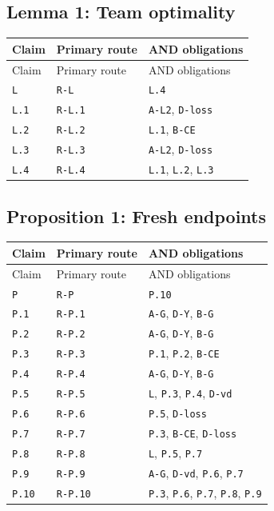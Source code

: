 \documentclass[11pt,letterpaper]{article}
\begin{document}
{\footnotesize \subsection{Lemma 1: Team optimality}
\begin{longtable}{>{\raggedright\arraybackslash}p{.14\linewidth}>{\raggedright\arraybackslash}p{.21\linewidth}>{\raggedright\arraybackslash}p{.54\linewidth}}
\toprule
Claim & Primary route & AND obligations \\
\midrule\endfirsthead
\toprule
Claim & Primary route & AND obligations \\
\midrule\endhead
\bottomrule\endfoot
\texttt{L} & \texttt{R-L} & \texttt{L.4} \\[3pt]
\texttt{L.1} & \texttt{R-L.1} & \texttt{A-L2}, \texttt{D-loss} \\[3pt]
\texttt{L.2} & \texttt{R-L.2} & \texttt{L.1}, \texttt{B-CE} \\[3pt]
\texttt{L.3} & \texttt{R-L.3} & \texttt{A-L2}, \texttt{D-loss} \\*[3pt]
\texttt{L.4} & \texttt{R-L.4} & \texttt{L.1}, \texttt{L.2}, \texttt{L.3} \\[3pt]
\end{longtable}
\subsection{Proposition 1: Fresh endpoints}
\begin{longtable}{>{\raggedright\arraybackslash}p{.14\linewidth}>{\raggedright\arraybackslash}p{.21\linewidth}>{\raggedright\arraybackslash}p{.54\linewidth}}
\toprule
Claim & Primary route & AND obligations \\
\midrule\endfirsthead
\toprule
Claim & Primary route & AND obligations \\
\midrule\endhead
\bottomrule\endfoot
\texttt{P} & \texttt{R-P} & \texttt{P.10} \\[3pt]
\texttt{P.1} & \texttt{R-P.1} & \texttt{A-G}, \texttt{D-Y}, \texttt{B-G} \\[3pt]
\texttt{P.2} & \texttt{R-P.2} & \texttt{A-G}, \texttt{D-Y}, \texttt{B-G} \\[3pt]
\texttt{P.3} & \texttt{R-P.3} & \texttt{P.1}, \texttt{P.2}, \texttt{B-CE} \\[3pt]
\texttt{P.4} & \texttt{R-P.4} & \texttt{A-G}, \texttt{D-Y}, \texttt{B-G} \\[3pt]
\texttt{P.5} & \texttt{R-P.5} & \texttt{L}, \texttt{P.3}, \texttt{P.4}, \texttt{D-vd} \\[3pt]
\texttt{P.6} & \texttt{R-P.6} & \texttt{P.5}, \texttt{D-loss} \\[3pt]
\texttt{P.7} & \texttt{R-P.7} & \texttt{P.3}, \texttt{B-CE}, \texttt{D-loss} \\[3pt]
\texttt{P.8} & \texttt{R-P.8} & \texttt{L}, \texttt{P.5}, \texttt{P.7} \\[3pt]
\texttt{P.9} & \texttt{R-P.9} & \texttt{A-G}, \texttt{D-vd}, \texttt{P.6}, \texttt{P.7} \\*[3pt]
\texttt{P.10} & \texttt{R-P.10} & \texttt{P.3}, \texttt{P.6}, \texttt{P.7}, \texttt{P.8}, \texttt{P.9} \\[3pt]
\end{longtable}
}
\end{document}

